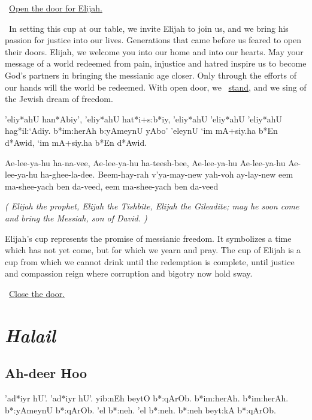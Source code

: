 \documentclass[12pt]{article}
\newenvironment{hebrewPrayer}
    {\begin{cjhebrew}
     \Large
    }
    {
    \end{cjhebrew}
    }
\newenvironment{hebrewTransliteration}{}{\par}
\newenvironment{unreadHebrewTranslation}{\itshape(\hspace{-0.2em}}{\hspace{-0.2em})\par}
\newcommand{\god}{God}
\newcommand{\hebrewVowelOh}{\textrm{\hspace{0.2em}}o\textrm{\hspace{-0.2em}}}
\newcommand{\stepHalailEn}{Halail}
\newcommand{\stepHalailHe}{hal*el}
\newcommand{\inlineSederAction}[1]{\faHandORight{}~\underline{#1}}
\newcommand{\sederAction}[1]{\inlineSederAction{#1}\par}
\newcommand{\sederSection}[2]{
    \section*{{\Huge \cjRL{#2}} \textit{#1}}
}
\newcommand{\newReading}{\faBook{}\ }
\begin{document}
\sederAction{Open the door for Elijah.}

\newReading In setting this cup at our table, we invite Elijah to join us,
and we bring his passion for justice into our lives.
Generations that came before us feared to open their doors.
Elijah, we welcome you into our home and into our hearts.
May your message of a world redeemed from pain, injustice
and hatred inspire us to become {\god}'s partners in bringing
the messianic age closer.
Only through the efforts of our hands will the world be redeemed. With open door, we \inlineSederAction{stand}, and we sing of the Jewish dream of freedom.

\begin{hebrewPrayer}
    'eliy*ahU han*Abiy'\textrm{,} 'eliy*ahU hat*i+s:b*iy\textrm{,} 'eliy*ahU 'eliy*ahU 'eliy*ahU hag*il:`Adiy\textrm{.} b*im:herAh b:yAmeynU \hbox{yAb{\hebrewVowelOh}'} 'eleynU `im mA+siy.ha b*En d*Awid\textrm{,} `im mA+siy.ha b*En d*Awid\textrm{.}
\end{hebrewPrayer}

\begin{hebrewTransliteration}
    Ae-lee-ya-hu ha-na-vee, Ae-lee-ya-hu ha-teesh-bee, Ae-lee-ya-hu Ae-lee-ya-hu Ae-lee-ya-hu ha-ghee-la-dee. Beem-hay-rah v'ya-may-new yah-voh ay-lay-new eem ma-shee-yach ben da-veed, eem ma-shee-yach ben da-veed
\end{hebrewTransliteration}

\begin{unreadHebrewTranslation}
    Elijah the prophet, Elijah the Tishbite, Elijah the Gileadite; may he soon come and bring the Messiah, son of David.
\end{unreadHebrewTranslation}

Elijah's cup represents the promise of messianic freedom. It symbolizes a time which has not yet come, but for which we yearn and pray. The cup of Elijah is a cup from which we cannot drink until the redemption is complete, until justice and compassion reign where corruption and bigotry now hold sway.

\sederAction{Close the door.}



\sederSection{\stepHalailEn}{\stepHalailHe}

\subsection*{Ah-deer Hoo}

\begin{hebrewPrayer}
    'ad*iyr hU'\textrm{.} 'ad*iyr hU'\textrm{.} yib:nEh beytO b*:qArOb\textrm{.} b*im:herAh\textrm{.} b*im:herAh\textrm{.} b*:yAmeynU b*:qArOb\textrm{.} 'el b*:neh\textrm{.} 'el b*:neh\textrm{.} b*:neh beyt:kA b*:qArOb\textrm{.}
\end{hebrewPrayer}
\end{document}
